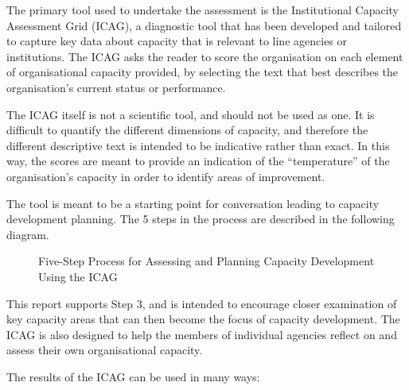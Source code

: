 \documentclass[
  10pt,
]{report}
\begin{document}
The primary tool used to undertake the assessment is the Institutional
Capacity Assessment Grid (ICAG), a diagnostic tool that has been
developed and tailored to capture key data about capacity that is
relevant to line agencies or institutions. The ICAG asks the reader to
score the organisation on each element of organisational capacity
provided, by selecting the text that best describes the organisation's
current status or performance.

The ICAG itself is not a scientific tool, and should not be used as one.
It is difficult to quantify the different dimensions of capacity, and
therefore the different descriptive text is intended to be indicative
rather than exact. In this way, the scores are meant to provide an
indication of the ``temperature'' of the organisation's capacity in
order to identify areas of improvement.

The tool is meant to be a starting point for conversation leading to
capacity development planning. The 5 steps in the process are described
in the following diagram.

\begin{figure}[H]

\caption{\label{fig-five-steps-assessing-planning-capacity-development}Five-Step
Process for Assessing and Planning Capacity Development Using the ICAG}


\end{figure}%

This report supports Step 3, and is intended to encourage closer
examination of key capacity areas that can then become the focus of
capacity development. The ICAG is also designed to help the members of
individual agencies reflect on and assess their own organisational
capacity.

The results of the ICAG can be used in many ways:
\end{document}
